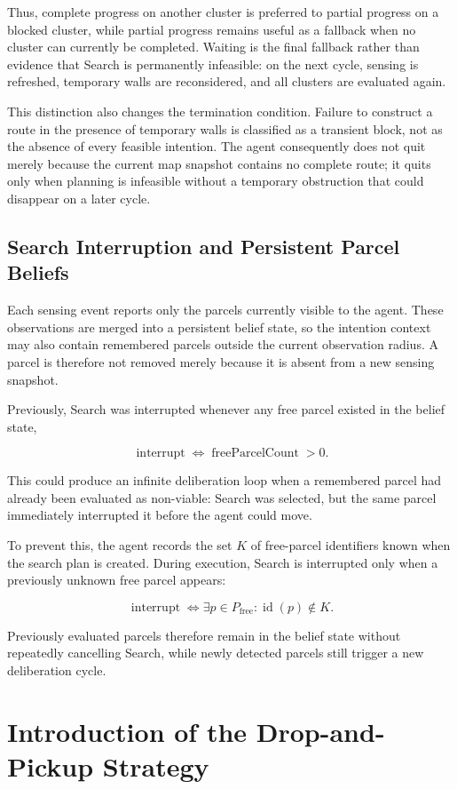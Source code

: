 \documentclass[a4paper]{article}
\begin{document}
Thus, complete progress on another cluster is preferred to partial progress on
a blocked cluster, while partial progress remains useful as a fallback when no
cluster can currently be completed. Waiting is the final fallback rather than
evidence that Search is permanently infeasible: on the next cycle, sensing is
refreshed, temporary walls are reconsidered, and all clusters are evaluated
again.

This distinction also changes the termination condition. Failure to construct
a route in the presence of temporary walls is classified as a transient block,
not as the absence of every feasible intention. The agent consequently does
not quit merely because the current map snapshot contains no complete route;
it quits only when planning is infeasible without a temporary obstruction that
could disappear on a later cycle.

\subsection{Search Interruption and Persistent Parcel Beliefs}
\label{sec:search-interruption}

Each sensing event reports only the parcels currently visible to the agent.
These observations are merged into a persistent belief state, so the intention
context may also contain remembered parcels outside the current observation
radius. A parcel is therefore not removed merely because it is absent from a
new sensing snapshot.

Previously, Search was interrupted whenever any free parcel existed in the
belief state,

\[
    \operatorname{interrupt}
    \iff
    \operatorname{freeParcelCount} > 0.
\]

This could produce an infinite deliberation loop when a remembered parcel had
already been evaluated as non-viable: Search was selected, but the same parcel
immediately interrupted it before the agent could move.

To prevent this, the agent records the set $K$ of free-parcel identifiers known
when the search plan is created. During execution, Search is interrupted only
when a previously unknown free parcel appears:

\[
    \operatorname{interrupt}
    \iff
    \exists p\in P_{\mathrm{free}}:
    \operatorname{id}(p)\notin K.
\]

Previously evaluated parcels therefore remain in the belief state without
repeatedly cancelling Search, while newly detected parcels still trigger a new
deliberation cycle.\section{Introduction of the Drop-and-Pickup Strategy}
\end{document}
